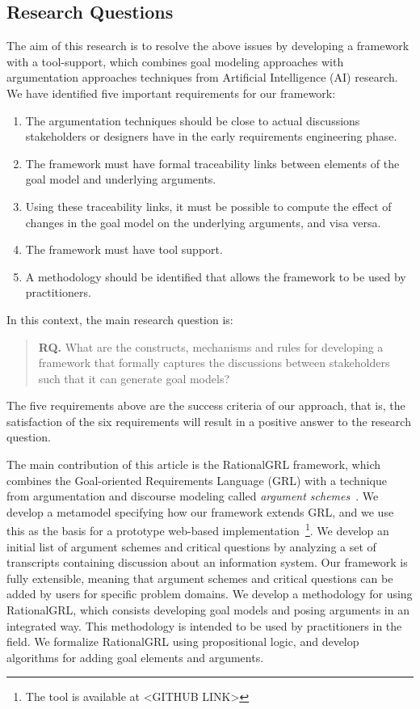 \subsection{Research Questions}
 
The aim of this research is to resolve the above issues by developing a framework with a tool-support, which combines goal modeling approaches with argumentation approaches techniques from Artificial Intelligence (AI) research\cite{atkinson2007}. We have identified five important requirements for our framework: 
\begin{enumerate}
\item The argumentation techniques should be close to actual discussions stakeholders or designers have in the early requirements engineering phase.
\item 
The framework must have formal traceability links between elements of the goal model and underlying arguments.
\item 
Using these traceability links, it must be possible to compute the effect of changes in the goal model on the underlying arguments, and visa versa.
\item 
The framework must have tool support.
\item 
A methodology should be identified that allows the framework to be used by practitioners.
\end{enumerate}

In this context, the main research question is: 

\begin{quote}
\textbf{RQ.} What are the constructs, mechanisms and rules for developing a framework that formally captures the discussions between stakeholders such that it can generate goal models?
\end{quote}

The five requirements above are the success criteria of our approach, that is, the satisfaction of the six requirements will result in a positive answer to the research question.

The main contribution of this article is the RationalGRL framework,  which combines the Goal-oriented Requirements Language (GRL) with a technique from argumentation and discourse modeling called \emph{argument schemes}~\cite{walton-etal2004}. We develop a metamodel specifying how our framework extends GRL, and we use this as the basis for a prototype web-based implementation~\footnote{The tool is available at <GITHUB LINK>}. We develop an initial list of argument schemes and critical questions by analyzing a set of transcripts containing discussion about an information system. Our framework is fully extensible, meaning that argument schemes and critical questions can be added by users for specific problem domains. We develop a methodology for using RationalGRL, which consists developing goal models and posing arguments in an integrated way. This methodology is intended to be used by practitioners in the field. We formalize RationalGRL using propositional logic, and develop algorithms for adding goal elements and arguments.

